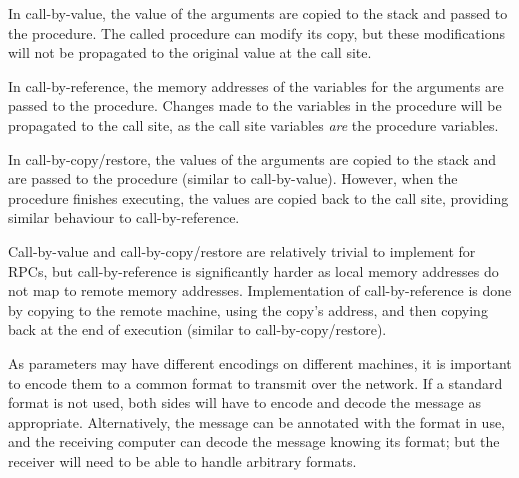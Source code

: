 In call-by-value, the value of the arguments are copied to the stack and passed to the procedure. The called procedure can modify its copy, but these modifications will not be propagated to the original value at the call site.

In call-by-reference, the memory addresses of the variables for the arguments are passed to the procedure. Changes made to the variables in the procedure will be propagated to the call site, as the call site variables \textit{are} the procedure variables.

In call-by-copy/restore, the values of the arguments are copied to the stack and are passed to the procedure (similar to call-by-value). However, when the procedure finishes executing, the values are copied back to the call site, providing similar behaviour to call-by-reference.

Call-by-value and call-by-copy/restore are relatively trivial to implement for RPCs, but call-by-reference is significantly harder as local memory addresses do not map to remote memory addresses. Implementation of call-by-reference is done by copying to the remote machine, using the copy's address, and then copying back at the end of execution (similar to call-by-copy/restore).

As parameters may have different encodings on different machines, it is important to encode them to a common format to transmit over the network. If a standard format is not used, both sides will have to encode and decode the message as appropriate. Alternatively, the message can be annotated with the format in use, and the receiving computer can decode the message knowing its format; but the receiver will need to be able to handle arbitrary formats.

